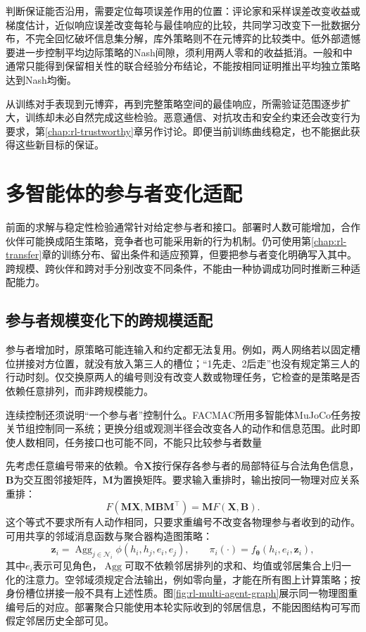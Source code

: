 判断保证能否沿用，需要定位每项误差作用的位置：评论家和采样误差改变收益或梯度估计，近似响应误差改变每轮与最佳响应的比较，共同学习改变下一批数据分布，不完全回忆破坏信息集分解，库外策略则不在元博弈的比较类中。低外部遗憾要进一步控制平均边际策略的Nash间隙，须利用两人零和的收益抵消。一般和中通常只能得到保留相关性的联合经验分布结论，不能按相同证明推出平均独立策略达到Nash均衡。

从训练对手表现到元博弈，再到完整策略空间的最佳响应，所需验证范围逐步扩大，训练却未必自然完成这些检验。恶意通信、对抗攻击和安全约束还会改变行为要求，第\ref{chap:rl-trustworthy}章另作讨论。即便当前训练曲线稳定，也不能据此获得这些新目标的保证。

\section{多智能体的参与者变化适配}
\label{sec:rl-multi-agent-adaptation}

前面的求解与稳定性检验通常针对给定参与者和接口。部署时人数可能增加，合作伙伴可能换成陌生策略，竞争者也可能采用新的行为机制。仍可使用第\ref{chap:rl-transfer}章的训练分布、留出条件和适应预算，但要把参与者变化明确写入其中。跨规模、跨伙伴和跨对手分别改变不同条件，不能由一种协调成功同时推断三种适配能力。

\subsection{参与者规模变化下的跨规模适配}
\label{sec:rl-multi-agent-scale}

参与者增加时，原策略可能连输入和约定都无法复用。例如，两人网络若以固定槽位拼接对方位置，就没有放入第三人的槽位；“1先走、2后走”也没有规定第三人的行动时刻。仅交换原两人的编号则没有改变人数或物理任务，它检查的是策略是否依赖任意排列，而非跨规模能力。

连续控制还须说明“一个参与者”控制什么。FACMAC所用多智能体MuJoCo任务按关节组控制同一系统；更换分组或观测半径会改变各人的动作和信息范围。此时即使人数相同，任务接口也可能不同，不能只比较参与者数量

先考虑任意编号带来的依赖。令$\bm X$按行保存各参与者的局部特征与合法角色信息，$\bm B$为交互图邻接矩阵，$\bm M$为置换矩阵。要求输入重排时，输出按同一物理对应关系重排：
\[
 F(\bm M\bm X,\bm M\bm B\bm M^\top)=\bm M F(\bm X,\bm B).
\]
这个等式不要求所有人动作相同，只要求重编号不改变各物理参与者收到的动作。可用共享的邻域消息函数与聚合器构造图策略：
\[
 \bm z_i=\operatorname{Agg}_{j\in\mathcal N_i}
           \phi(h_i,h_j,e_i,e_j),\qquad
 \pi_i(\cdot)=f_{\bm\theta}(h_i,e_i,\bm z_i),
\]
其中$e_i$表示可见角色，$\operatorname{Agg}$可取不依赖邻居排列的求和、均值或邻居集合上归一化的注意力。空邻域须规定合法输出，例如零向量，才能在所有图上计算策略；按身份槽位拼接一般不具有上述性质。图\ref{fig:rl-multi-agent-graph}展示同一物理图重编号后的对应。部署聚合只能使用本轮实际收到的邻居信息，不能因图结构可写而假定邻居历史全部可见。

